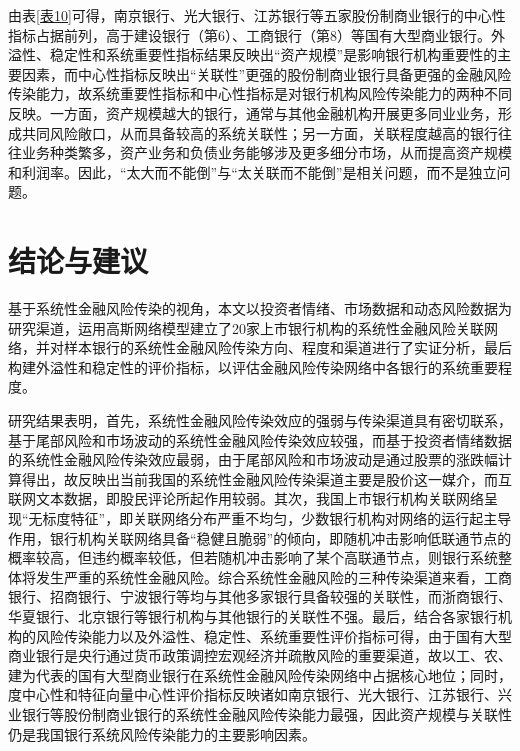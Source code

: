 \documentclass[lang=cn]{elegantpaper}
\begin{document}
由表\ref{表10}可得，南京银行、光大银行、江苏银行等五家股份制商业银行的中心性指标占据前列，高于建设银行（第6）、工商银行（第8）等国有大型商业银行。外溢性、稳定性和系统重要性指标结果反映出“资产规模”是影响银行机构重要性的主要因素，而中心性指标反映出“关联性”更强的股份制商业银行具备更强的金融风险传染能力，故系统重要性指标和中心性指标是对银行机构风险传染能力的两种不同反映。一方面，资产规模越大的银行，通常与其他金融机构开展更多同业业务，形成共同风险敞口，从而具备较高的系统关联性；另一方面，关联程度越高的银行往往业务种类繁多，资产业务和负债业务能够涉及更多细分市场，从而提高资产规模和利润率。因此，“太大而不能倒”与“太关联而不能倒”是相关问题，而不是独立问题。
\section{结论与建议}

基于系统性金融风险传染的视角，本文以投资者情绪、市场数据和动态风险数据为研究渠道，运用高斯网络模型建立了20家上市银行机构的系统性金融风险关联网络，并对样本银行的系统性金融风险传染方向、程度和渠道进行了实证分析，最后构建外溢性和稳定性的评价指标，以评估金融风险传染网络中各银行的系统重要程度。

研究结果表明，首先，系统性金融风险传染效应的强弱与传染渠道具有密切联系，基于尾部风险和市场波动的系统性金融风险传染效应较强，而基于投资者情绪数据的系统性金融风险传染效应最弱，由于尾部风险和市场波动是通过股票的涨跌幅计算得出，故反映出当前我国的系统性金融风险传染渠道主要是股价这一媒介，而互联网文本数据，即股民评论所起作用较弱。其次，我国上市银行机构关联网络呈现“无标度特征”，即关联网络分布严重不均匀，少数银行机构对网络的运行起主导作用，银行机构关联网络具备“稳健且脆弱”的倾向，即随机冲击影响低联通节点的概率较高，但违约概率较低，但若随机冲击影响了某个高联通节点，则银行系统整体将发生严重的系统性金融风险。综合系统性金融风险的三种传染渠道来看，工商银行、招商银行、宁波银行等均与其他多家银行具备较强的关联性，而浙商银行、华夏银行、北京银行等银行机构与其他银行的关联性不强。最后，结合各家银行机构的风险传染能力以及外溢性、稳定性、系统重要性评价指标可得，由于国有大型商业银行是央行通过货币政策调控宏观经济并疏散风险的重要渠道，故以工、农、建为代表的国有大型商业银行在系统性金融风险传染网络中占据核心地位；同时，度中心性和特征向量中心性评价指标反映诸如南京银行、光大银行、江苏银行、兴业银行等股份制商业银行的系统性金融风险传染能力最强，因此资产规模与关联性仍是我国银行系统风险传染能力的主要影响因素。
\end{document}

